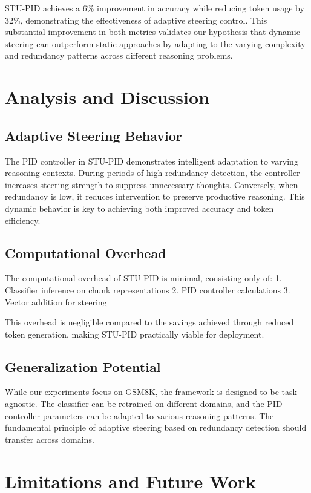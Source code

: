 \documentclass{article}
\begin{document}
STU-PID achieves a 6\% improvement in accuracy while reducing token usage by 32\%, demonstrating the effectiveness of adaptive steering control. This substantial improvement in both metrics validates our hypothesis that dynamic steering can outperform static approaches by adapting to the varying complexity and redundancy patterns across different reasoning problems.

\section{Analysis and Discussion}

\subsection{Adaptive Steering Behavior}

The PID controller in STU-PID demonstrates intelligent adaptation to varying reasoning contexts. During periods of high redundancy detection, the controller increases steering strength to suppress unnecessary thoughts. Conversely, when redundancy is low, it reduces intervention to preserve productive reasoning. This dynamic behavior is key to achieving both improved accuracy and token efficiency.

\subsection{Computational Overhead}

The computational overhead of STU-PID is minimal, consisting only of:
1. Classifier inference on chunk representations
2. PID controller calculations
3. Vector addition for steering

This overhead is negligible compared to the savings achieved through reduced token generation, making STU-PID practically viable for deployment.

\subsection{Generalization Potential}

While our experiments focus on GSM8K, the framework is designed to be task-agnostic. The classifier can be retrained on different domains, and the PID controller parameters can be adapted to various reasoning patterns. The fundamental principle of adaptive steering based on redundancy detection should transfer across domains.

\section{Limitations and Future Work}
\end{document}
